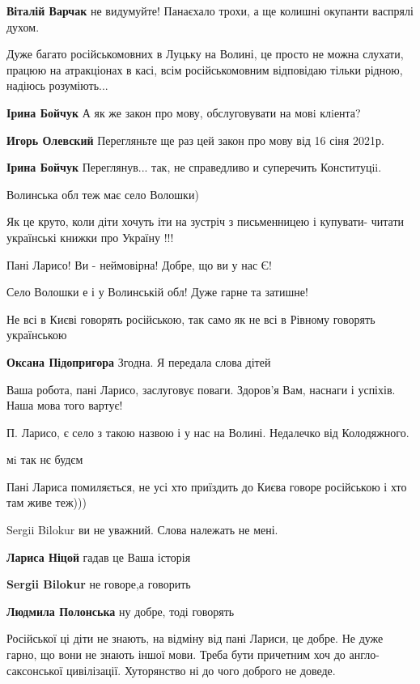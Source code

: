 \begin{itemize}
\textbf{Віталій Варчак} не видумуйте! Панаєхало трохи, а ще колишні окупанти васпрялі духом.


Дуже багато російськомовних в Луцьку на Волині, це просто не можна слухати,
працюю на атракціонах в касі, всім російськомовним відповідаю тільки рідною,
надіюсь розуміють...

\textbf{Ірина Бойчук}
А як же закон про мову, обслуговувати на мовi клiента?

\textbf{Игорь Олевский} Перегляньте ще раз цей закон про мову від 16 сіня 2021р.

\textbf{Ірина Бойчук}
Переглянув... так, не справедливо и суперечить Конституцii.

Волинська обл теж має село Волошки)

Як це круто, коли діти хочуть іти на зустріч з письменницею і купувати- читати українські книжки про Україну !!!

Пані Ларисо! Ви - неймовірна! Добре, що ви у нас Є!

Село Волошки е і у Волинській обл! Дуже гарне та затишне!

Не всі в Києві говорять російською, так само як не всі в Рівному говорять українською

\textbf{Оксана Підопригора} Згодна. Я передала слова дітей

Ваша робота, пані Ларисо, заслуговує поваги. Здоров'я Вам, наснаги і успіхів. Наша мова того вартує!

П. Ларисо, є село з такою назвою і у нас на Волині. Недалечко від Колодяжного.

мi так нє будєм

Пані Лариса помиляється, не усі хто приїздить до Києва говоре російською і хто там живе теж)))

Sergii Bilokur ви не уважний. Слова належать не мені.

\textbf{Лариса Ніцой} гадав це Ваша історія

\textbf{Sergii Bilokur} не говоре,а говорить

\textbf{Людмила Полонська} ну добре, тоді говорять


Російської ці діти не знають, на відміну від пані Лариси, це добре. Не дуже
гарно, що вони не знають іншої мови. Треба бути причетним хоч до
англо-саксонської цивілізації. Хуторянство ні до чого доброго не доведе.

\end{itemize}
